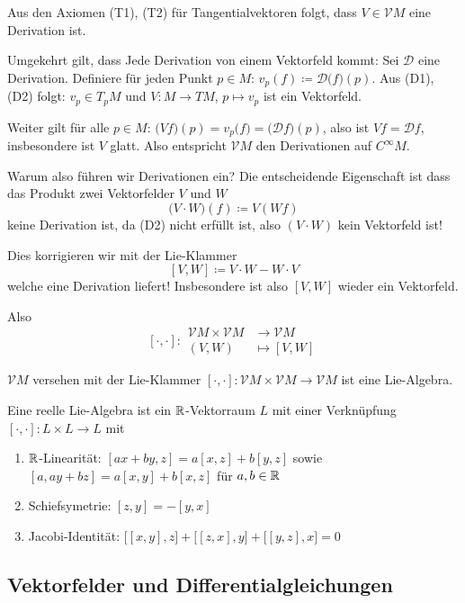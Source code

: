 \documentclass[a4paper,twoside,DIV15,BCOR12mm]{scrbook}
\renewcommand{\da}{\coloneqq}
\newcommand{\VM}{\mathcal V M}
\begin{document}
Aus den Axiomen (T1), (T2) für Tangentialvektoren folgt, dass $V\in\VM $ eine Derivation ist.

Umgekehrt gilt, dass Jede Derivation von einem Vektorfeld kommt:  Sei $\mathcal D$ eine Derivation. Definiere für jeden Punkt $p\in M$: $v_p(f) \da \mathcal D\big(f\big)(p)$. Aus (D1), (D2) folgt: $v_p\in T_pM$ und $V: M \to TM$, $p\mapsto v_p$ ist ein Vektorfeld.

Weiter gilt für alle $p\in M$: $\big(Vf\big)(p) = v_p\big(f\big) = \big(\mathcal D f\big) (p)$, also ist $Vf = \mathcal D f$, insbesondere ist $V$ glatt. Also entspricht $\VM $ den Derivationen auf $C^\infty M$.

Warum also führen wir Derivationen ein? Die entscheidende Eigenschaft ist dass das Produkt zwei Vektorfelder $V$ und $W$
\[
\big(V \cdot W\big) (f) \da V (W f)
\]
keine Derivation ist, da (D2) nicht erfüllt ist, also $(V\cdot W)$ kein Vektorfeld ist!

Dies korrigieren wir mit der Lie-Klammer
\[
[V,W] \da V\cdot W  - W\cdot V
\]
welche eine Derivation liefert! Insbesondere ist also $[V,W]$ wieder ein Vektorfeld.

Also 
\[[\cdot,\cdot]:
\begin{aligned}
\VM  \times \VM  &\to \VM  \\
(V,W) &\mapsto [V,W]
\end{aligned}
\]

\begin{lemma}
$\VM $ versehen mit der Lie-Klammer $[\cdot,\cdot]:\VM  \times \VM  \to \VM $ ist eine Lie-Algebra.
\label{lem5}
\end{lemma}

\begin{definition}
Eine reelle Lie-Algebra ist ein $\mathbb{R}$-Vektorraum $L$ mit einer Verknüpfung $[\cdot,\cdot]: L\times L \to L$ mit 
\begin{enumerate}[(L1)]
\item $\mathbb{R}$-Linearität: $[ax+by, z] = a [x,z] + b[y,z]$ sowie
$[a,ay + bz] = a[x,y] + b[x,z]$ für $a,b\in\mathbb{R}$
\item Schiefsymetrie: $[z,y] = -[y,x]$
\item Jacobi-Identität: $\big[ [x,y], z\big] + \big[ [z,x], y\big] + \big[[y,z], x\big] = 0$
\end{enumerate}
\end{definition}

\subsection*{Vektorfelder und Differentialgleichungen}
\end{document}
